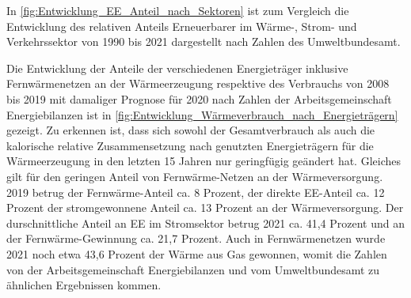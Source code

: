 				
				In \autoref{fig:Entwicklung_EE_Anteil_nach_Sektoren} ist zum Vergleich die Entwicklung des relativen Anteils Erneuerbarer im Wärme-, Strom- und Verkehrssektor von 1990 bis 2021 dargestellt nach Zahlen des Umweltbundesamt.
				
				Die Entwicklung der Anteile der verschiedenen Energieträger inklusive Fernwärmenetzen an der Wärmeerzeugung respektive des Verbrauchs von 2008 bis 2019 mit damaliger Prognose für 2020 nach Zahlen der Arbeitsgemeinschaft Energiebilanzen ist in \autoref{fig:Entwicklung_Wärmeverbrauch_nach_Energieträgern} gezeigt. Zu erkennen ist, dass sich sowohl der Gesamtverbrauch als auch die kalorische relative Zusammensetzung nach genutzten Energieträgern für die Wärmeerzeugung in den letzten 15 Jahren nur geringfügig geändert hat. Gleiches gilt für den geringen Anteil von Fernwärme-Netzen an der Wärmeversorgung. 2019 betrug der Fernwärme-Anteil ca. 8 Prozent, der direkte EE-Anteil ca. 12 Prozent der stromgewonnene Anteil ca. 13 Prozent an der Wärmeversorgung. Der durschnittliche Anteil an EE im Stromsektor betrug 2021 ca. 41,4 Prozent und an der Fernwärme-Gewinnung ca. 21,7 Prozent. Auch in Fernwärmenetzen wurde 2021 noch etwa 43,6 Prozent der Wärme aus Gas gewonnen, womit die Zahlen von der Arbeitsgemeinschaft Energiebilanzen und vom Umweltbundesamt zu ähnlichen Ergebnissen kommen.
				
